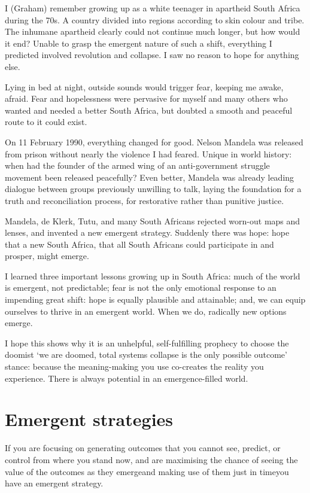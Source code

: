 \begin{longstoryblock}
I (Graham) remember growing up as a white teenager in apartheid South Africa during the 70s. A country divided into regions according to skin colour and tribe. The inhumane apartheid clearly could not continue much longer, but how would it end? Unable to grasp the emergent nature of such a shift, everything I predicted involved revolution and collapse. I saw no reason to hope for anything else. 


Lying in bed at night, outside sounds would trigger fear, keeping me awake, afraid. Fear and hopelessness were pervasive for myself and many others who wanted and needed a better South Africa, but doubted a smooth and peaceful route to it could exist.  


On 11 February 1990, everything changed for good. Nelson Mandela was released from prison without nearly the violence I had feared. Unique in world history: when had the founder of the armed wing of an anti-government struggle movement been released peacefully? Even better, Mandela was already leading dialogue between groups previously unwilling to talk, laying the foundation for a truth and reconciliation process, for restorative rather than punitive justice. 


Mandela, de Klerk, Tutu, and many South Africans rejected worn-out maps and lenses, and invented a new emergent strategy. Suddenly there was hope: hope that a new South Africa, that all South Africans could participate in and prosper, might emerge.


I learned three important lessons growing up in South Africa: much of the world is emergent, not predictable; fear is not the only emotional response to an impending great shift: hope is equally plausible and attainable; and, we can equip ourselves to thrive in an emergent world. When we do, radically new options emerge. 
\end{longstoryblock}


I hope this shows why it is an unhelpful, self-fulfilling prophecy to choose the doomist ‘we are doomed, total systems collapse is the only possible outcome’ stance: because the meaning\hyp{}making you use co-creates the reality you experience. There is always potential in an emergence-filled world.
\section{Emergent strategies}
\label{section:emergent-strategies}
If you are focusing on generating outcomes that you cannot see, predict, or control from where you stand now, and are maximising the chance of seeing the value of the outcomes as they emerge\textemdash and making use of them just in time\textemdash you have an emergent strategy. 


